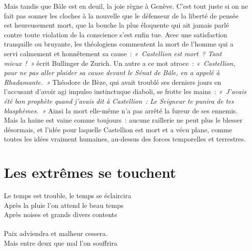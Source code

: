 \documentclass[french,twoside]{book} %
\newcommand{\bibl}[1]{{\RaggedLeft{#1}\par\bigskip}}
\newcommand\chapteropen{} %
\newcommand\chapterclose{} %
\begin{document}
\noindent Mais tandis que Bâle est en deuil, la joie règne à Genève. C’est tout juste si on ne fait pas sonner les cloches à la nouvelle que le défenseur de la liberté de pensée est heureusement mort, que la bouche la plus éloquente qui ait jamais parlé contre toute violation de la conscience s’est enfin tue. Avec une satisfaction tranquille ou bruyante, les théologiens commentent la mort de l’homme qui a servi calmement et honnêtement sa cause : \emph{« Castellion est mort ? Tant mieux ! »} écrit Bullinger de Zurich. Un autre a ce mot atroce : \emph{« Castellion, pour ne pas aller plaider sa cause devant le Sénat de Bâle, en a appelé à Rhadamante. »} Théodore de Bèze, qui avait troublé ses derniers jours en l’accusant d’avoir agi impulso instinctuque diaboli, se frotte les mains : \emph{« J’avais été bon prophète quand j’avais dit à Castellion : Le Seigneur te punira de tes blasphèmes. »} Ainsi la mort elle-même n’a pas arrêté la fureur de ses ennemis. Mais la haine est vaine comme toujours : aucune raillerie ne peut plus le blesser désormais, et l’idée pour laquelle Castellion est mort et a vécu plane, comme toutes les idées vraiment humaines, au-dessus des forces temporelles et terrestres.
\chapterclose


\chapteropen
\chapter[{Les extrêmes se touchent}]{Les extrêmes se touchent}\renewcommand{\leftmark}{Les extrêmes se touchent}


\epigraph{Le temps est trouble, le temps se éclaircira\\
Après la pluie l’on attend le beau temps\\
Après noises et grands divers contents\\
\\
Paix adviendra et malheur cessera.\\
Mais entre deux que mal l’on souffrira\\
}{
\bibl{Chanson de Marguerite d’Autriche}
}
\end{document}
